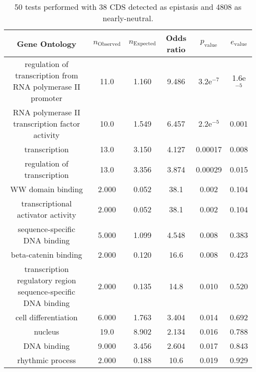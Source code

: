\documentclass[USLetter,5pt]{article}
\begin{document}
\begin{table}[ht]
\centering
\begin{adjustbox}{width = 1\textwidth}
\small\begin{tabular}{|c|c|c|c|c|c|}
\hline
Gene Ontology & $n_{\mathrm{Observed}}$ & $n_{\mathrm{Expected}}$ & Odds ratio & $p_{\mathrm{value}}$ & $e_{\mathrm{value}}$\\
\hline
regulation of transcription from RNA polymerase II promoter &   11.0 &  1.160 &  9.486 & 3.2e$^{-7}$ & 1.6e$^{-5}$\\
RNA polymerase II transcription factor activity &   10.0 &  1.549 &  6.457 & 2.2e$^{-5}$ &  0.001\\
transcription &   13.0 &  3.150 &  4.127 & 0.00017 &  0.008\\
regulation of transcription &   13.0 &  3.356 &  3.874 & 0.00029 &  0.015\\
WW domain binding &  2.000 &  0.052 &   38.1 &  0.002 &  0.104\\
transcriptional activator activity &  2.000 &  0.052 &   38.1 &  0.002 &  0.104\\
sequence-specific DNA binding &  5.000 &  1.099 &  4.548 &  0.008 &  0.383\\
beta-catenin binding &  2.000 &  0.120 &   16.6 &  0.008 &  0.423\\
transcription regulatory region sequence-specific DNA binding &  2.000 &  0.135 &   14.8 &  0.010 &  0.520\\
cell differentiation &  6.000 &  1.763 &  3.404 &  0.014 &  0.692\\
nucleus &   19.0 &  8.902 &  2.134 &  0.016 &  0.788\\
DNA binding &  9.000 &  3.456 &  2.604 &  0.017 &  0.843\\
rhythmic process &  2.000 &  0.188 &   10.6 &  0.019 &  0.929\\
\hline
\end{tabular}
\end{adjustbox}
\caption{50 tests performed with 38 CDS detected as epistasis and 4808 as nearly-neutral.
}
\end{table}
\end{document}
